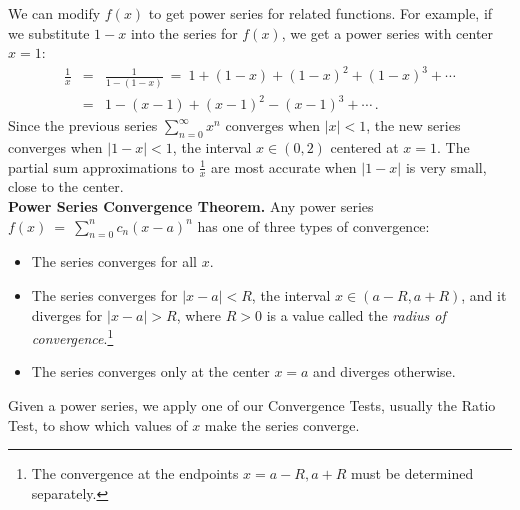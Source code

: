 \documentclass[11pt]{article}
\begin{document}
We can modify $f(x)$ to get power series for related functions.
For example, if we substitute $1{-}x$ into the series for $f(x)$, 
we get a power series with center $x=1$:
$$\begin{array}{rcl}
\frac1x &=& \frac1{1-(1{-}x)} 
\ =\ 1 + (1{-}x) + (1{-}x)^2 + (1{-}x)^3 + \cdots
\\[.5em]
&=& 1 - (x{-}1) + (x{-}1)^2 - (x{-}1)^3 + \cdots\,.
\end{array}$$
Since the previous series $\sum_{n=0}^\infty x^n$ converges when $|x|<1$, 
the new series converges when $|1{-}x|<1$, 
the interval $x\in(0,2)$ centered at $x=1$. 
The partial sum approximations to $\frac1x$
are most accurate when $|1{-}x|$ is very
small, close to the center.
\\[1em]
{\bf Power Series Convergence Theorem.}
Any power series $f(x) \ =\ \sum_{n=0}^n c_n(x{-}a)^n$ has
one of three types of convergence:
\begin{itemize}
\item The series converges for all $x$.

\item The series converges for $|x{-}a|<R$, the interval $x\in(a{}-R,a{+}R)$, and it diverges for $|x{-}a|>R$,
where $R>0$ is a value called the {\it radius of convergence}.\footnote{ 
The convergence at the endpoints $x=a{-}R,a{+}R$ must be determined separately.
}

\item The series converges only at the center $x=a$ and diverges otherwise.
\end{itemize}

\noindent
Given a power series, we apply one of our Convergence Tests, usually the Ratio Test, to show which values of $x$ make the
series converge.

\addtolength{\textheight}{1in}

\newpage

\addtolength{\topmargin}{-.5in}
\end{document}
